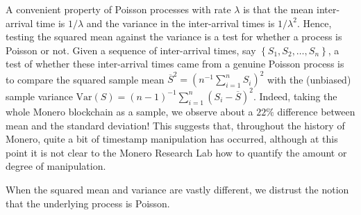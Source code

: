 \documentclass[12pt,english]{mrl}
\theoremstyle{definition}
\numberwithin{equation}{section}
\numberwithin{figure}{section}
\numberwithin{equation}{section}
\numberwithin{equation}{section}
\numberwithin{figure}{section}
\begin{document}
A convenient property of Poisson processes with rate $\lambda$ is that the mean inter-arrival time is $1/\lambda$ and the variance in the inter-arrival times is $1/\lambda^2$. Hence, testing the squared mean against the variance is a test for whether a process is Poisson or not. Given a sequence of inter-arrival times, say $\left\{S_1, S_2, \ldots, S_n\right\}$, a test of whether these inter-arrival times came from a genuine Poisson process is to compare the squared sample mean $\overline{S}^2 = \left(n^{-1}\sum_{i=1}^{n} S_i\right)^2$ with the (unbiased) sample variance $\text{Var}(S) = (n-1)^{-1}\sum_{i=1}^{n} (S_i - \overline{S})^2$. Indeed, taking the whole Monero blockchain as a sample, we observe about a $22\%$ difference between mean and the standard deviation! This suggests that, throughout the history of Monero, quite a bit of timestamp manipulation has occurred, although at this point it is not clear to the Monero Research Lab how to quantify the amount or degree of manipulation.

When the squared mean and variance are vastly different, we distrust the notion that the underlying process is Poisson.

\end{document}
